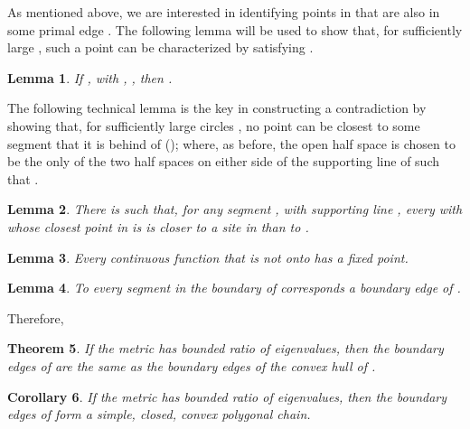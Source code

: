 \documentclass[11pt]{article}
\newtheorem{theorem}{Theorem}[section]
\newtheorem{lemma}[theorem]{Lemma}
\newtheorem{corollary}[theorem]{Corollary}
\begin{document}
As mentioned above, we are interested in identifying points in 
that are also in some primal edge . The following lemma will be used
to show that, for sufficiently large , such a point  can be
characterized by satisfying . 



\begin{lemma}\label{lem:mij}
	If , with ,  , then
. 
\end{lemma}












The following technical lemma is the key in constructing a contradiction by showing that, 
for sufficiently large circles , no
point  can be closest to some segment
 that it is behind of (); 
where, as before, the open half space  is chosen to be 
the only of the two half spaces on either side of the supporting line  of  
such that . 





\begin{lemma}\label{lem:contrad}
	There is  such that, for any segment , with supporting line , every  with 
    whose closest point in  is  is 
	closer to a site in  than to . 
\end{lemma}







\begin{lemma}\label{lem:Sn}
	Every continuous function  that is not onto has a fixed point. 
\end{lemma}




\begin{lemma}\label{lem:hard}
 To every segment  in the boundary of
 corresponds a boundary edge of . \emph{}
\end{lemma}

Therefore,

\begin{theorem}\label{thm:boundary}
If the metric  has bounded ratio of eigenvalues, then the boundary edges of  are the same as the boundary edges of the convex hull of .  \emph{} 
\end{theorem}

\begin{corollary}\label{col:simple-boundary}
If the metric  has bounded ratio of eigenvalues, then the boundary edges of  form a simple, closed, convex polygonal chain. \end{corollary}
\end{document}
